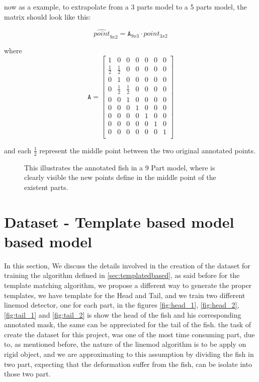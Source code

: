 now as a example, to extrapolate from a 3 parts model to a 5 parts model, the matrix
should look like this:


\begin{equation}
\hat{point}_{9x2} =\mathtt{A}_{9x3} \cdot point_{3x2}
\end{equation}

where
 \begin{equation}
 \label{eq:extrapole}
\mathtt{A} =
\begin{bmatrix}
1  & 0 & 0 & 0 & 0 & 0 & 0 \\
\frac{1}{2} & \frac{1}{2}  & 0 & 0 & 0 & 0 & 0 \\
0 & 1  & 0 & 0 & 0 & 0 & 0  \\
0 & \frac{1}{2} & \frac{1}{2} & 0 & 0 & 0 & 0 \\
0  & 0 & 1 & 0 & 0 & 0 & 0  \\
0  & 0 & 0 & 1 & 0 & 0 & 0  \\
0  & 0 & 0 & 0 & 1 & 0 & 0 \\
0  & 0 & 0 & 0 & 0 & 1 & 0 \\
0  & 0 & 0 & 0 & 0 & 0 & 1  \\
\end{bmatrix}
 \end{equation}

and each $\frac{1}{2}$ represent the middle point between the two original annotated
points.

\begin{figure}
\begin{adjustwidth}{-1in}{-1in} 
\label{fig:anotated1}
\centering     %
{}
\caption{This illustrates the annotated fish in a 9 Part model, where is clearly visible
the new points define in the middle point of the existent parts.}
\end{adjustwidth}
\end{figure}

 \section{Dataset - Template based model based model}
 In this section, We discuss the details involved in the creation of the dataset for
 training the algorithm defined in \ref{sec:templatedbased}, as said before for the template 
 matching algorithm, we propose a different way to generate the proper templates, 
 we have template for the Head and Tail, and we train two different linemod detector,
 one for each part, in the figures \ref{fig:head_1}, \ref{fig:head_2}, \ref{fig:tail_1} and
 \ref{fig:tail_2} is show the head of the fish and his corresponding annotated mask, 
 the same can be appreciated for the tail of the fish. the task of create the dataset
 for this project, was one of the most time consuming part, due to, as mentioned before, 
 the nature of the linemod algorithm is to be apply on rigid object, and we are approximating to this
 assumption by dividing the fish in two part, expecting that the deformation suffer from the
 fish, can be isolate into those two part.

